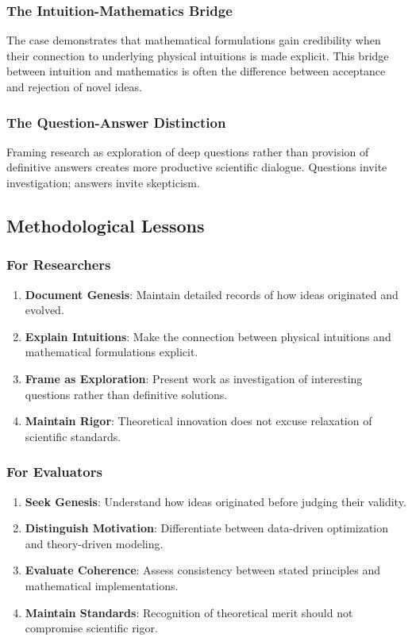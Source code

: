 \subsubsection{The Intuition-Mathematics Bridge}

The case demonstrates that mathematical formulations gain credibility when their connection to underlying physical intuitions is made explicit. This bridge between intuition and mathematics is often the difference between acceptance and rejection of novel ideas.

\subsubsection{The Question-Answer Distinction}

Framing research as exploration of deep questions rather than provision of definitive answers creates more productive scientific dialogue. Questions invite investigation; answers invite skepticism.

\subsection{Methodological Lessons}

\subsubsection{For Researchers}

\begin{enumerate}
\item \textbf{Document Genesis}: Maintain detailed records of how ideas originated and evolved.
\item \textbf{Explain Intuitions}: Make the connection between physical intuitions and mathematical formulations explicit.
\item \textbf{Frame as Exploration}: Present work as investigation of interesting questions rather than definitive solutions.
\item \textbf{Maintain Rigor}: Theoretical innovation does not excuse relaxation of scientific standards.
\end{enumerate}

\subsubsection{For Evaluators}

\begin{enumerate}
\item \textbf{Seek Genesis}: Understand how ideas originated before judging their validity.
\item \textbf{Distinguish Motivation}: Differentiate between data-driven optimization and theory-driven modeling.
\item \textbf{Evaluate Coherence}: Assess consistency between stated principles and mathematical implementations.
\item \textbf{Maintain Standards}: Recognition of theoretical merit should not compromise scientific rigor.
\end{enumerate}

